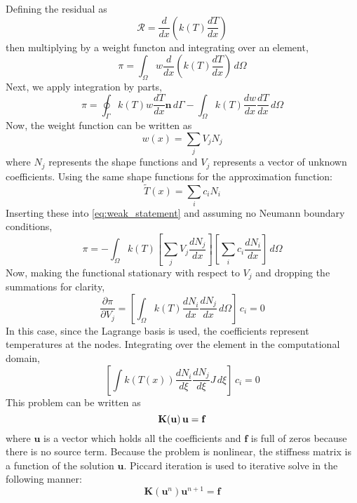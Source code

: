 \documentclass{article}
\begin{document}
Defining the residual as
\begin{equation}
  \mathcal{R} = \frac{d}{dx} \left( k(T) \frac{dT}{dx} \right) 
\end{equation}
then multiplying by a weight functon and integrating over an element,
\begin{equation}
  \pi = \int_{\Omega} w \frac{d}{dx} \left(k(T) \frac{dT}{dx}\right) \, d\Omega 
\end{equation}
Next, we apply integration by parts,
\begin{equation}
  \label{eq:weak_statement}
  \pi = \oint_{\Gamma} k(T) w \frac{dT}{dx} \hat{\mathbf{n}}\, d\Gamma - \int_\Omega k(T) \frac{dw}{dx} \frac{dT}{dx} \, d\Omega
\end{equation}
Now, the weight function can be written as 
\begin{equation}
  w(x) = \sum_{j} V_j N_j
\end{equation}
where $N_j$ represents the shape functions and $V_j$ represents a vector of unknown coefficients.  Using the same shape functions for the approximation function:
\begin{equation}
  \widetilde{T}(x) = \sum_i c_i N_i 
\end{equation}
Inserting these into \eqref{eq:weak_statement} and assuming no Neumann boundary conditions,
\begin{equation}
  \pi = - \int_\Omega k(T) \left[ \sum_j V_j \frac{dN_j}{dx} \right] \left[\sum_i c_i \frac{dN_i}{dx} \right] \, d\Omega
\end{equation}
Now, making the functional stationary with respect to $V_j$ and dropping the summations for clarity,
\begin{equation}
  \frac{\partial \pi}{\partial V_j} = \left[\int_\Omega k(T) \frac{dN_i}{dx} \frac{dN_j}{dx} \, d\Omega \right] \, c_i = 0
\end{equation}
In this case, since the Lagrange basis is used, the coefficients represent temperatures at the nodes.  Integrating over the element in the computational domain,
\begin{equation}
  \left[\int k(T(x)) \frac{dN_i}{d\xi} \frac{dN_j}{d\xi} J \, d\xi \right] \, c_i = 0
  \label{eq:11}
\end{equation}
This problem can be written as 
\begin{equation}
  {\bf K(u) \, u = f}
\end{equation}
where $\mathbf{u}$ is a vector which holds all the coefficients and $\mathbf{f}$ is full of zeros because there is no source term.  Because the problem is nonlinear, the stiffness matrix is a function of the solution $\mathbf{u}$.  Piccard iteration is used to iterative solve in the following manner:
\begin{equation}
  \mathbf{K}(\mathbf{u}^n) \mathbf{u}^{n+1} = \mathbf{f}
  \label{eq:13}
\end{equation}
\end{document}
